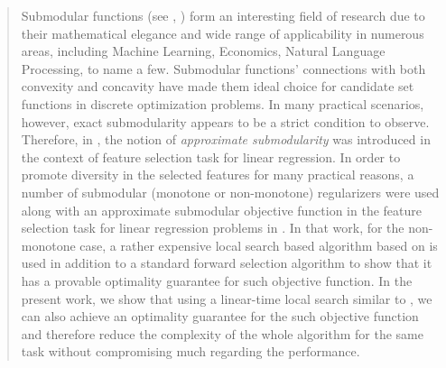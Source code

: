 \documentclass[a4paper,12pt]{report}
\begin{document}
\renewcommand{\abstractname}{Abstract}
\begin{abstract}
 Submodular functions (see \citealp{Lovasz}, \citealp{nara}) form an interesting field of research due to their mathematical elegance and wide range of applicability in numerous areas, including Machine Learning, Economics, Natural Language Processing, to name a few. Submodular functions' connections with both convexity and concavity have made them ideal choice for candidate set functions in discrete optimization problems. In many practical scenarios, however, exact submodularity appears to be a strict condition to observe. Therefore, in \citealp{DasDK11}, the notion of \emph{approximate submodularity} was introduced in the context of feature selection task for linear regression. In order to promote diversity in the selected features for many practical reasons, a number of submodular (monotone or non-monotone) regularizers were used along with an approximate submodular objective function in the feature selection task for linear regression problems in \citealp{NIPS2012_4689}. In that work, for the non-monotone case, a rather expensive local search based algorithm based on \citealp{Feige:2011:MNS:2079073.2079078} is used in addition to a standard forward selection algorithm to show that it has a provable optimality guarantee for such objective function. In the present work, we show that using a linear-time local search similar to \citealp{Buchbinder:2012:TLT:2417500.2417835}, we can also achieve an optimality guarantee for the such objective function and therefore reduce the complexity of the whole algorithm for the same task without compromising much regarding the performance.
\end{abstract}

\tableofcontents
\listoffigures

\clearpage
{}
\pagestyle{headings}









\end{document}
